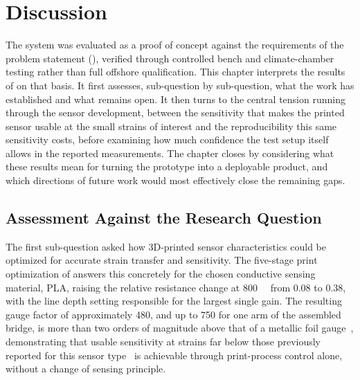 \chapter{Discussion} \label{sec:Discussion}

The system was evaluated as a proof of concept against the requirements of the problem statement (), verified through controlled bench and climate-chamber testing rather than full offshore qualification. This chapter interprets the results of  on that basis. It first assesses, sub-question by sub-question, what the work has established and what remains open. It then turns to the central tension running through the sensor development, between the sensitivity that makes the printed sensor usable at the small strains of interest and the reproducibility this same sensitivity costs, before examining how much confidence the test setup itself allows in the reported measurements. The chapter closes by considering what these results mean for turning the prototype into a deployable product, and which directions of future work would most effectively close the remaining gaps.

\section{Assessment Against the Research Question}
The first sub-question asked how 3D-printed sensor characteristics could be optimized for accurate strain transfer and sensitivity. The five-stage print optimization of  answers this concretely for the chosen conductive sensing material, PLA, raising the relative resistance change at \SI{800}{\micro\strain} from \num{0.08} to \num{0.38}, with the line depth setting responsible for the largest single gain. The resulting gauge factor of approximately \num{480}, and up to \num{750} for one arm of the assembled bridge, is more than two orders of magnitude above that of a metallic foil gauge~\cite{metal_gauge}, demonstrating that usable sensitivity at strains far below those previously reported for this sensor type~\cite{G.O.A.T} is achievable through print-process control alone, without a change of sensing principle.

